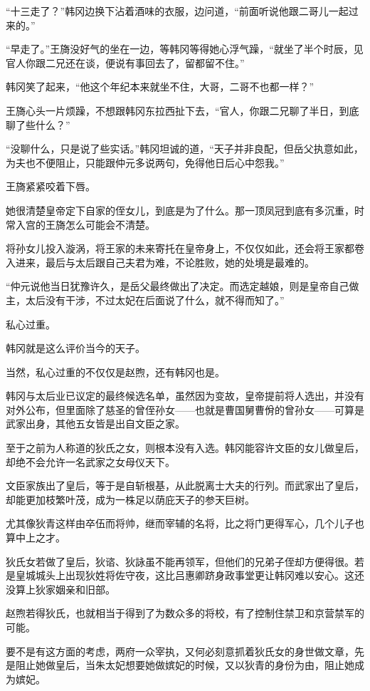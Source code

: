 “十三走了？”韩冈边换下沾着酒味的衣服，边问道，“前面听说他跟二哥儿一起过来的。”

“早走了。”王旖没好气的坐在一边，等韩冈等得她心浮气躁，“就坐了半个时辰，见官人你跟二兄还在谈，便说有事回去了，留都留不住。”

韩冈笑了起来，“他这个年纪本来就坐不住，大哥，二哥不也都一样？”

王旖心头一片烦躁，不想跟韩冈东拉西扯下去，“官人，你跟二兄聊了半日，到底聊了些什么？”

“没聊什么，只是说了些实话。”韩冈坦诚的道，“天子并非良配，但岳父执意如此，为夫也不便阻止，只能跟仲元多说两句，免得他日后心中怨我。”

王旖紧紧咬着下唇。

她很清楚皇帝定下自家的侄女儿，到底是为了什么。那一顶凤冠到底有多沉重，时常入宫的王旖怎么可能会不清楚。

将孙女儿投入漩涡，将王家的未来寄托在皇帝身上，不仅仅如此，还会将王家都卷入进来，最后与太后跟自己夫君为难，不论胜败，她的处境是最难的。

“仲元说他当日犹豫许久，是岳父最终做出了决定。而选定越娘，则是皇帝自己做主，太后没有干涉，不过太妃在后面说了什么，就不得而知了。”

私心过重。

韩冈就是这么评价当今的天子。

当然，私心过重的不仅仅是赵煦，还有韩冈也是。

韩冈与太后业已议定的最终候选名单，虽然因为变故，皇帝提前将人选出，并没有对外公布，但里面除了慈圣的曾侄孙女——也就是曹国舅曹佾的曾孙女——可算是武家出身，其他五女皆是出自文臣之家。

至于之前为人称道的狄氏之女，则根本没有入选。韩冈能容许文臣的女儿做皇后，却绝不会允许一名武家之女母仪天下。

文臣家族出了皇后，等于是自斩根基，从此脱离士大夫的行列。而武家出了皇后，却能更加枝繁叶茂，成为一株足以荫庇天子的参天巨树。

尤其像狄青这样由卒伍而将帅，继而宰辅的名将，比之将门更得军心，几个儿子也算中上之才。

狄氏女若做了皇后，狄谘、狄詠虽不能再领军，但他们的兄弟子侄却方便得很。若是皇城城头上出现狄姓将佐守夜，这比吕惠卿跻身政事堂更让韩冈难以安心。这还没算上狄家姻亲和旧部。

赵煦若得狄氏，也就相当于得到了为数众多的将校，有了控制住禁卫和京营禁军的可能。

要不是有这方面的考虑，两府一众宰执，又何必刻意抓着狄氏女的身世做文章，先是阻止她做皇后，当朱太妃想要她做嫔妃的时候，又以狄青的身份为由，阻止她成为嫔妃。

